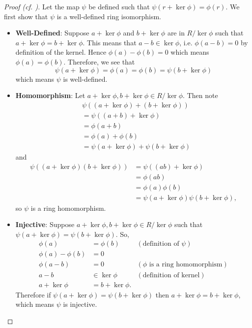 \begin{proof}[Proof (cf. {\cite[p.~302, Factor Theorem For Rings]{cohn_1982}})]
    Let the map $\psi$ be defined such that $\psi(r + \ker\phi) = \phi(r)$. We first show that $\psi$ is a well-defined ring isomorphism.
    \begin{itemize}
        \item \textbf{Well-Defined}: Suppose $a + \ker\phi$ and $b + \ker\phi$ are in $R/\ker\phi$ such that $a + \ker\phi = b+\ker\phi$. This means that $a - b \in \ker\phi$, i.e. $\phi(a-b) = 0$ by definition of the kernel. Hence $\phi(a) - \phi(b) = 0$ which means $\phi(a) = \phi(b)$. Therefore, we see that
        \[
            \psi(a + \ker\phi) = \phi(a) = \phi(b) = \psi(b + \ker\phi)
        \]
        which means $\psi$ is well-defined.

        \item \textbf{Homomorphism}: Let $a + \ker\phi, b + \ker\phi \in R/\ker\phi$. Then note
        \begin{align*}
            &\psi((a + \ker\phi)+(b+\ker\phi))\\
            &= \psi((a+b)+\ker\phi)\\
            &= \phi(a+b)\\
            &= \phi(a) + \phi(b)\\
            &= \psi(a + \ker\phi) + \psi(b + \ker\phi)
        \end{align*}
        and
        \begin{align*}
            \psi((a + \ker\phi)(b+\ker\phi)) &= \psi((ab)+\ker\phi)\\
            &= \phi(ab)\\
            &= \phi(a)\phi(b)\\
            &= \psi(a + \ker\phi)\psi(b + \ker\phi),
        \end{align*}
        so $\psi$ is a ring homomorphism.

        \item \textbf{Injective}: Suppose $a + \ker\phi, b + \ker\phi \in R/\ker\phi$ such that $\psi(a+\ker\phi) = \psi(b+\ker\phi)$. So,
        \begin{align*}
            \phi(a) &= \phi(b) & (\text{definition of }\psi)\\
            \phi(a) - \phi(b) &= 0\\
            \phi(a-b) &= 0 & (\phi \text{ is a ring homomorphism})\\
            a - b &\in \ker\phi & (\text{definition of kernel})\\
            a + \ker\phi &= b + \ker\phi.
        \end{align*}
        Therefore if $\psi(a+\ker\phi) = \psi(b+\ker\phi)$ then $a+\ker\phi = b+\ker\phi$, which means $\psi$ is injective.


\end{itemize}
\end{proof}
